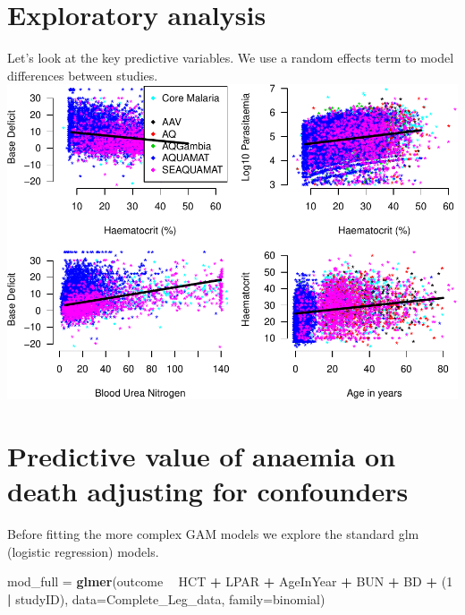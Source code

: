 \documentclass[]{article}
\newenvironment{Shaded}{\begin{snugshade}}{\end{snugshade}}
\newcommand{\KeywordTok}[1]{\textcolor[rgb]{0.13,0.29,0.53}{\textbf{#1}}}
\newcommand{\DataTypeTok}[1]{\textcolor[rgb]{0.13,0.29,0.53}{#1}}
\newcommand{\DecValTok}[1]{\textcolor[rgb]{0.00,0.00,0.81}{#1}}
\newcommand{\StringTok}[1]{\textcolor[rgb]{0.31,0.60,0.02}{#1}}
\newcommand{\OperatorTok}[1]{\textcolor[rgb]{0.81,0.36,0.00}{\textbf{#1}}}
\newcommand{\NormalTok}[1]{#1}
\begin{document}
\section{Exploratory analysis}\label{exploratory-analysis}

Let's look at the key predictive variables. We use a random effects term
to model differences between studies.
\includegraphics{LegacyAnalysis_files/figure-latex/ExploratoryPlots-1.pdf}

\section{Predictive value of anaemia on death adjusting for
confounders}\label{predictive-value-of-anaemia-on-death-adjusting-for-confounders}

Before fitting the more complex GAM models we explore the standard glm
(logistic regression) models.

\begin{Shaded}
\begin{Highlighting}[]
\NormalTok{mod_full =}\StringTok{ }\KeywordTok{glmer}\NormalTok{(outcome }\OperatorTok{~}\StringTok{ }\NormalTok{HCT }\OperatorTok{+}\StringTok{ }\NormalTok{LPAR }\OperatorTok{+}\StringTok{ }\NormalTok{AgeInYear }\OperatorTok{+}\StringTok{ }\NormalTok{BUN }\OperatorTok{+}\StringTok{ }\NormalTok{BD }\OperatorTok{+}\StringTok{ }\NormalTok{(}\DecValTok{1} \OperatorTok{|}\StringTok{ }\NormalTok{studyID),}
               \DataTypeTok{data=}\NormalTok{Complete_Leg_data, }\DataTypeTok{family=}\NormalTok{binomial)}
\end{Highlighting}
\end{Shaded}
\end{document}
